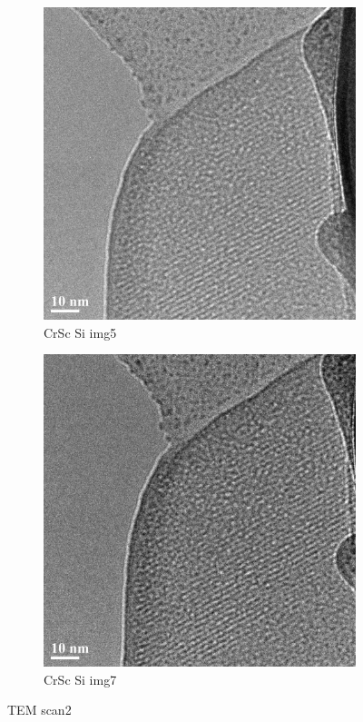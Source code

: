 \begin{figure}[h!]
	\begin{subfigure}[b]{0.45\textwidth}
		\includegraphics[width=\textwidth]{./Images/TEM/CrSc_Si_img5}
		\caption{CrSc Si img5}
		\label{fig:CrSc_Si_img5}
	\end{subfigure}
	\begin{subfigure}[b]{0.45\textwidth}
		\includegraphics[width=\textwidth]{./Images/TEM/CrSc_Si_img7}
		\caption{CrSc Si img7}
		\label{fig:CrSc_Si_img7}
	\end{subfigure}
	\caption{TEM scan2}
	\label{fig:TEM scan2}
\end{figure}

